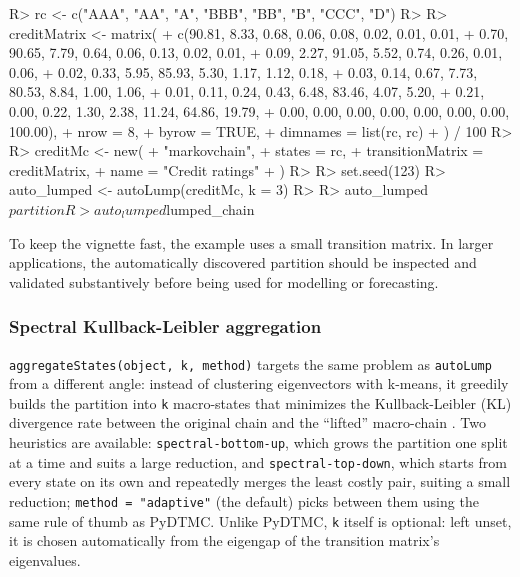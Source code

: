 \documentclass[
  nojss]{jss}
\begin{document}
\begin{CodeChunk}
\begin{CodeInput}
R> rc <- c("AAA", "AA", "A", "BBB", "BB", "B", "CCC", "D")
R> 
R> creditMatrix <- matrix(
+   c(90.81, 8.33, 0.68, 0.06, 0.08, 0.02, 0.01, 0.01,
+     0.70, 90.65, 7.79, 0.64, 0.06, 0.13, 0.02, 0.01,
+     0.09, 2.27, 91.05, 5.52, 0.74, 0.26, 0.01, 0.06,
+     0.02, 0.33, 5.95, 85.93, 5.30, 1.17, 1.12, 0.18,
+     0.03, 0.14, 0.67, 7.73, 80.53, 8.84, 1.00, 1.06,
+     0.01, 0.11, 0.24, 0.43, 6.48, 83.46, 4.07, 5.20,
+     0.21, 0.00, 0.22, 1.30, 2.38, 11.24, 64.86, 19.79,
+     0.00, 0.00, 0.00, 0.00, 0.00, 0.00, 0.00, 100.00),
+   nrow = 8,
+   byrow = TRUE,
+   dimnames = list(rc, rc)
+ ) / 100
R> 
R> creditMc <- new(
+   "markovchain",
+   states = rc,
+   transitionMatrix = creditMatrix,
+   name = "Credit ratings"
+ )
R> 
R> set.seed(123)
R> auto_lumped <- autoLump(creditMc, k = 3)
R> 
R> auto_lumped$partition
R> auto_lumped$lumped_chain
\end{CodeInput}
\end{CodeChunk}

To keep the vignette fast, the example uses a small transition matrix. In larger
applications, the automatically discovered partition should be inspected and
validated substantively before being used for modelling or forecasting.

\subsubsection{Spectral Kullback-Leibler aggregation}\label{spectral-kullback-leibler-aggregation}

\texttt{aggregateStates(object,\ k,\ method)} targets the same problem as \texttt{autoLump}
from a different angle: instead of clustering eigenvectors with k-means, it
greedily builds the partition into \texttt{k} macro-states that minimizes the
Kullback-Leibler (KL) divergence rate between the original chain and the
``lifted'' macro-chain \citep{deng2011optimal}. Two heuristics are available:
\texttt{spectral-bottom-up}, which grows the partition one split at a time and suits
a large reduction, and \texttt{spectral-top-down}, which starts from every state on
its own and repeatedly merges the least costly pair, suiting a small
reduction; \texttt{method\ =\ "adaptive"} (the default) picks between them using the
same rule of thumb as PyDTMC. Unlike PyDTMC, \texttt{k} itself is optional: left
unset, it is chosen automatically from the eigengap of the transition
matrix's eigenvalues.
\end{document}
